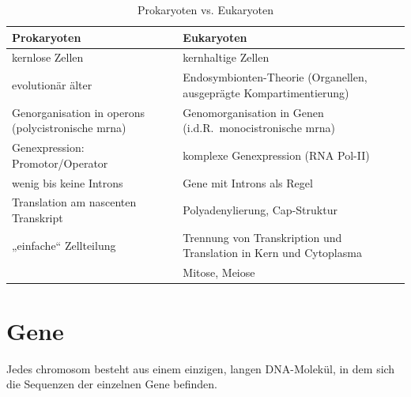 

\begin{table}[H]
    \centering
    \begin{tabular}{p{6cm} p{6cm}}
        \textbf{Prokaryoten} & \textbf{Eukaryoten} \\
        \hline

        kernlose Zellen &
        kernhaltige Zellen \\

        evolutionär älter &
        Endosymbionten-Theorie (Organellen, ausgeprägte Kompartimentierung) \\

        Genorganisation in \gls{operon}s (\gls{polycistronisch}e \gls{mrna}) &
        Genomorganisation in Genen (i.d.R.\ \gls{monocistronisch}e \gls{mrna}) \\

        Genexpression: Promotor/Operator &
        komplexe Genexpression (RNA Pol-II) \\

        wenig bis keine Introns &
        Gene mit Introns als Regel \\

        Translation am nascenten Transkript &
        Polyadenylierung, Cap-Struktur \\

        „einfache“ Zellteilung &
        Trennung von Transkription und Translation in Kern und Cytoplasma \\

        &
        Mitose, Meiose \\
    \end{tabular}
    \caption{Prokaryoten vs. Eukaryoten}\label{tab:prokaryoten-vs-eukaryoten}
\end{table}



\section{Gene}\label{sec:gene}
Jedes \gls{chromosom} besteht aus einem einzigen, langen DNA-Molekül,
in dem sich die Sequenzen der einzelnen Gene befinden.


